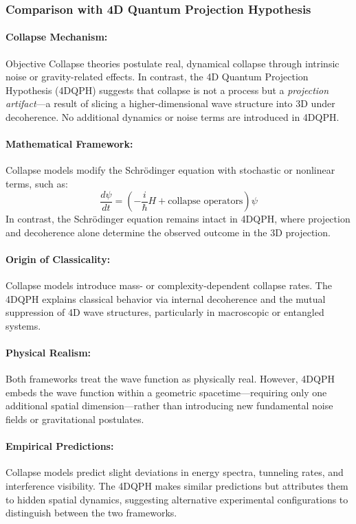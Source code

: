 \documentclass[12pt]{article}
\begin{document}
\subsubsection*{Comparison with 4D Quantum Projection Hypothesis}

\paragraph{Collapse Mechanism:} Objective Collapse theories postulate real, dynamical collapse through intrinsic noise or gravity-related effects. In contrast, the 4D Quantum Projection Hypothesis (4DQPH) suggests that collapse is not a process but a \textit{projection artifact}—a result of slicing a higher-dimensional wave structure into 3D under decoherence. No additional dynamics or noise terms are introduced in 4DQPH.

\paragraph{Mathematical Framework:} Collapse models modify the Schrödinger equation with stochastic or nonlinear terms, such as:
\begin{equation}
\frac{d\psi}{dt} = \left( -\frac{i}{\hbar} H + \text{collapse operators} \right) \psi
\end{equation}
In contrast, the Schrödinger equation remains intact in 4DQPH, where projection and decoherence alone determine the observed outcome in the 3D projection.

\paragraph{Origin of Classicality:} Collapse models introduce mass- or complexity-dependent collapse rates. The 4DQPH explains classical behavior via internal decoherence and the mutual suppression of 4D wave structures, particularly in macroscopic or entangled systems.

\paragraph{Physical Realism:} Both frameworks treat the wave function as physically real. However, 4DQPH embeds the wave function within a geometric spacetime—requiring only one additional spatial dimension—rather than introducing new fundamental noise fields or gravitational postulates.

\paragraph{Empirical Predictions:} Collapse models predict slight deviations in energy spectra, tunneling rates, and interference visibility. The 4DQPH makes similar predictions but attributes them to hidden spatial dynamics, suggesting alternative experimental configurations to distinguish between the two frameworks.
\end{document}
